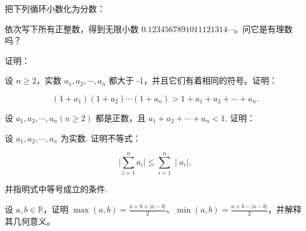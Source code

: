 \noindent\begin{minipage}{\textwidth}
把下列循环小数化为分数：
\end{minipage}\par\vfill
\newpage
\noindent\begin{minipage}{\textwidth}
依次写下所有正整数，得到无限小数 $0.1234567891011121314\cdots$。问它是有理数吗？
\end{minipage}\par\vfill
\noindent\begin{minipage}{\textwidth}
证明：
\end{minipage}\par\vfill
\noindent\begin{minipage}{\textwidth}
设  $ n \geqslant 2 $，实数  $ a_{1}, a_{2}, \cdots, a_{n} $ 都大于 -1，并且它们有着相同的符号。证明：

\[(1+a_{1})(1+a_{2})\cdots(1+a_{n})>1+a_{1}+a_{2}+\cdots+a_{n}.\]
\end{minipage}\par\vfill
\newpage
\noindent\begin{minipage}{\textwidth}
设  $ a_{1}, a_{2}, \cdots, a_{n} (n \geqslant 2) $ 都是正数，且  $ a_{1} + a_{2} + \cdots + a_{n} < 1 $. 证明：
\end{minipage}\par\vfill
\noindent\begin{minipage}{\textwidth}
设  $ a_{1}, a_{2}, \cdots, a_{n} $ 为实数. 证明不等式：

\[\big|\sum_{i=1}^{n}a_{i}\big|\leqslant\sum_{i=1}^{n}\mid a_{i}\mid,\]

并指明式中等号成立的条件.
\end{minipage}\par\vfill
\noindent\begin{minipage}{\textwidth}
设 $a,b\in\mathbb R$，证明 $\max(a,b)=\frac{a+b+|a-b|}{2}$、$\min(a,b)=\frac{a+b-|a-b|}{2}$，并解释其几何意义。
\end{minipage}\par\vfill
